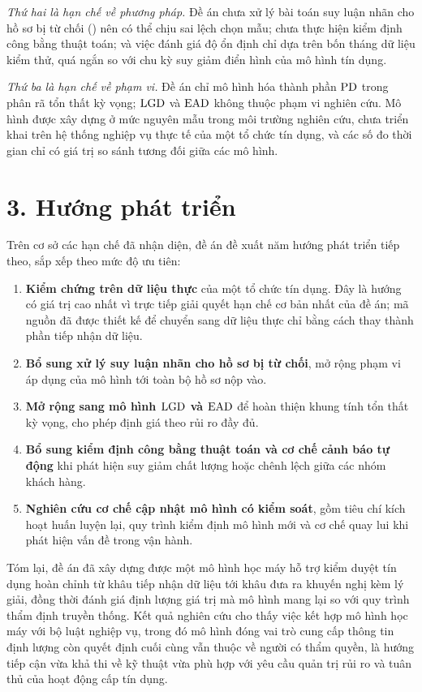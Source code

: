 \textit{Thứ hai là hạn chế về phương pháp.} Đề án chưa xử lý bài toán suy luận
nhãn cho hồ sơ bị từ chối () nên có thể chịu sai lệch chọn
mẫu; chưa thực hiện kiểm định công bằng thuật toán; và việc đánh giá độ ổn định
chỉ dựa trên bốn tháng dữ liệu kiểm thử, quá ngắn so với chu kỳ suy giảm điển
hình của mô hình tín dụng.

\textit{Thứ ba là hạn chế về phạm vi.} Đề án chỉ mô hình hóa thành phần $\mathrm{PD}$
trong phân rã tổn thất kỳ vọng; $\mathrm{LGD}$ và $\mathrm{EAD}$ không thuộc phạm vi nghiên cứu.
Mô hình được xây dựng ở mức nguyên mẫu trong môi trường nghiên cứu, chưa triển
khai trên hệ thống nghiệp vụ thực tế của một tổ chức tín dụng, và các số đo thời
gian chỉ có giá trị so sánh tương đối giữa các mô hình.

\section*{3. Hướng phát triển}

Trên cơ sở các hạn chế đã nhận diện, đề án đề xuất năm hướng phát triển tiếp
theo, sắp xếp theo mức độ ưu tiên:

\begin{enumerate}[label=(\arabic*)]
  \item \textbf{Kiểm chứng trên dữ liệu thực} của một tổ chức tín dụng. Đây là
  hướng có giá trị cao nhất vì trực tiếp giải quyết hạn chế cơ bản nhất của đề
  án; mã nguồn đã được thiết kế để chuyển sang dữ liệu thực chỉ bằng cách thay
  thành phần tiếp nhận dữ liệu.

  \item \textbf{Bổ sung xử lý suy luận nhãn cho hồ sơ bị từ chối}, mở rộng phạm
  vi áp dụng của mô hình tới toàn bộ hồ sơ nộp vào.

  \item \textbf{Mở rộng sang mô hình $\mathrm{LGD}$ và $\mathrm{EAD}$} để hoàn thiện khung tính
  tổn thất kỳ vọng, cho phép định giá theo rủi ro đầy đủ.

  \item \textbf{Bổ sung kiểm định công bằng thuật toán và cơ chế cảnh báo tự
  động} khi phát hiện suy giảm chất lượng hoặc chênh lệch giữa các nhóm khách
  hàng.

  \item \textbf{Nghiên cứu cơ chế cập nhật mô hình có kiểm soát}, gồm tiêu chí
  kích hoạt huấn luyện lại, quy trình kiểm định mô hình mới và cơ chế quay lui
  khi phát hiện vấn đề trong vận hành.
\end{enumerate}

\vspace{0.8cm}

Tóm lại, đề án đã xây dựng được một mô hình học máy hỗ trợ kiểm duyệt tín dụng
hoàn chỉnh từ khâu tiếp nhận dữ liệu tới khâu đưa ra khuyến nghị kèm lý giải,
đồng thời đánh giá định lượng giá trị mà mô hình mang lại so với quy trình thẩm
định
truyền thống. Kết quả nghiên cứu cho thấy việc kết hợp mô hình học máy với bộ
luật nghiệp vụ, trong đó mô hình đóng vai trò cung cấp thông tin định lượng còn
quyết định cuối cùng vẫn thuộc về người có thẩm quyền, là hướng tiếp cận vừa khả
thi về kỹ thuật vừa phù hợp với yêu cầu quản trị rủi ro và tuân thủ của hoạt động
cấp tín dụng.
